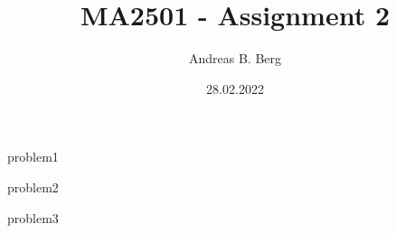 \documentclass{article}
\begin{document}
\mainmatter

\title{MA2501 - Assignment 2}
\author{Andreas B. Berg}
\date{28.02.2022}
\maketitle
\thispagestyle{fancy}

{problem1}

{problem2}

{problem3}

\end{document}
